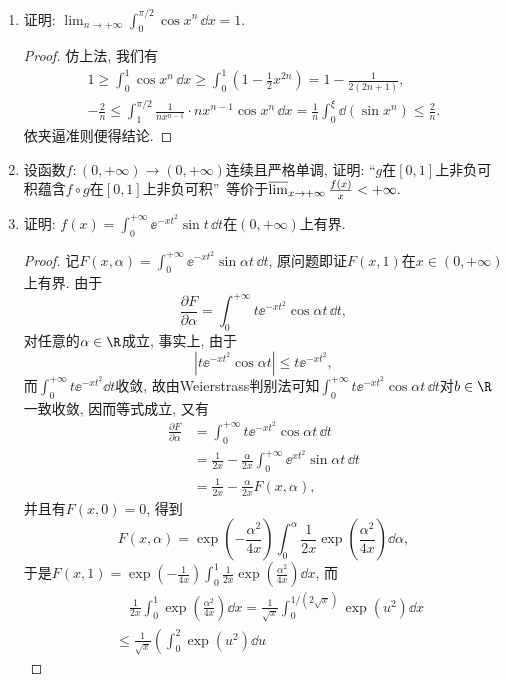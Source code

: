 \begin{b}
\begin{enumerate}
\begin{proof}
\end{proof}
\item 证明: \(\lim_{n\rightarrow+\infty}\int_{0}^{\pi/2}\cos x^n\,\dd x=1\). 
\begin{proof}
仿上法, 我们有\begin{gather*}
1\geqslant\int_{0}^{1}\cos x^n\,\dd x\geqslant\int_{0}^{1}\left(1-\frac{1}{2}x^{2n}\right)=1-\frac{1}{2(2n+1)},\\
-\frac{2}{n}\leqslant\int_{1}^{\pi/2}\frac{1}{nx^{n-1}}\cdot nx^{n-1}\cos x^n\,\dd x
=\frac{1}{n}\int_{0}^{\xi}\dd(\sin x^n)\leqslant\frac{2}{n}.
\end{gather*}
依夹逼准则便得结论.
\end{proof}
\item 设函数\(f:(0,+\infty)\rightarrow(0,+\infty)\)连续且严格单调, 
证明: “\(g\)在\([0,1]\)上非负可积蕴含\(f\circ g\)在\([0,1]\)上非负可积”\(\,\)
等价于\(\varlimsup_{x\rightarrow+\infty}\frac{f(x)}{x}<+\infty.\)
\item 证明: \(f(x)=\int_{0}^{+\infty}\ee^{-xt^2}\sin t\,\dd t\)在\((0,+\infty)\)上有界.
\begin{proof}
记\(F(x,\alpha)=\int_{0}^{+\infty}\ee^{-xt^2}\sin\alpha t\,\dd t\), 
原问题即证\(F(x,1)\)在\(x\in (0,+\infty)\)上有界. 由于
\[\frac{\partial F}{\partial \alpha}
=\int_{0}^{+\infty}t\ee^{-xt^2}\cos\alpha t\,\dd t,\]
对任意的\(\alpha\in\R\)成立, 事实上, 由于
\[\left|t\ee^{-xt^2}\cos\alpha t\right|\leqslant t\ee^{-xt^2},\]
而\(\int_{0}^{+\infty}t\ee^{-xt^2}\dd t\)收敛, 
故由Weierstrass判别法可知\(\int_{0}^{+\infty}t\ee^{-xt^2}\cos\alpha t\,\dd t\)对\(b\in\R\)一致收敛, 因而等式成立, 又有
\begin{align*}\frac{\partial F}{\partial \alpha}
&=\int_{0}^{+\infty}t\ee^{-xt^2}\cos\alpha t\,\dd t\\
&=\frac{1}{2x}-\frac{\alpha}{2x}\int_{0}^{+\infty}\ee^{xt^2}\sin\alpha t\,\dd t\\
&=\frac{1}{2x}-\frac{\alpha}{2x}F(x,\alpha),\end{align*}
并且有\(F(x,0)=0\), 得到
\[F(x,\alpha)=\exp\left(-\frac{\alpha^2}{4x}\right)\int_{0}^{\alpha}\frac{1}{2x}\exp\left(\frac{\alpha^2}{4x}\right)\dd\alpha,\]
于是\(F(x,1)=\exp\left(-\frac{1}{4x}\right)\int_{0}^{1}\frac{1}{2x}\exp\left(\frac{\alpha^2}{4x}\right)\dd x\), 而
\[\begin{split}
&\quad\frac{1}{2x}\int_{0}^{1}\exp\left(\frac{\alpha^2}{4x}\right)\dd x
=\frac{1}{\sqrt{x}}\int_{0}^{1/(2\sqrt{x})}\exp\left(u^2\right)\dd x\\
&\leqslant\frac{1}{\sqrt{x}}\left(\int_{0}^{2}\exp\left(u^2\right)\dd u

\end{split}\]
\end{proof}
\end{enumerate}
\end{b}
